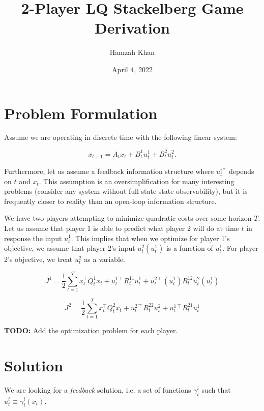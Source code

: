 \documentclass[11pt]{article}
\title{2-Player LQ Stackelberg Game Derivation}
\author{Hamzah Khan} \date{April 4, 2022}
\newcommand{\T}{\intercal}
\begin{document}
\section{Problem Formulation}
Assume we are operating in discrete time with the following linear system:

\begin{equation}
\label{eq:2p-dynamics}
x_{t+1} = A_t x_t + B^{1}_t u^{1}_t + B^{2}_t u^{2}_t.
\end{equation}


Furthermore, let us assume a feedback information structure where $u^{i*}_t$ depends on $t$ and $x_t$. This assumption is an oversimplification for many interesting problems (consider any system without full state state observability), but it is frequently closer to reality than an open-loop information structure.

We have two players attempting to minimize quadratic costs over some horizon $T$. Let us assume that player 1 is able to predict what player 2 will do at time $t$ in response the input $u^1_t$. This implies that when we optimize for player 1's objective, we assume that player 2's input $u^2_t(u^1_t)$ is a function of $u^1_t$. For player 2's objective, we treat $u^2_t$ as a variable.

\begin{equation}
\label{eq:p1-objective}
J^1 = \frac{1}{2} \sum_{t=1}^T x^\T_t Q^1_t x_t + u^{1\T}_t R^{11}_t u^1_t + u^{2\T}_t(u^1_t) R^{12}_t u^2_t(u^1_t)
\end{equation}

\begin{equation}
\label{eq:p2-objective}
J^2 = \frac{1}{2} \sum_{t=1}^T x^\T_t Q^2_t x_t + u^{2\T}_t R^{22}_t u^2_t + u^{1\T}_t R^{21}_t u^1_t
\end{equation}

\textbf{TODO:} Add the optimization problem for each player.


\section{Solution}

We are looking for a \emph{feedback} solution, i.e. a set of functions $\gamma^i_t$ such that $u^i_t \equiv \gamma^i_t(x_t)$.
\end{document}
